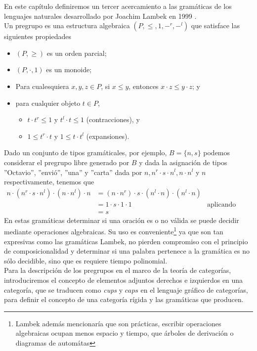 \documentclass[../main.tex]{subfiles}
\begin{document}
    En este capítulo definiremos un tercer acercamiento a las gramáticas de los lenguajes naturales desarrollado por Joachim Lambek en 1999 \cite{lambek99}. \\
    Un pregrupo es una estructura algebraica $(P,\leq,1, -^r,- ^l)$ que satisface las siguientes propiedades
        \begin{itemize}
            \item $(P, \geq)$ es un orden parcial;
            \item $(P,\cdot,1)$ es un monoide;
            \item Para cualesquiera $x,y,z \in P$, si $x \leq y$, entonces $x\cdot z \leq y \cdot z$; y
            \item para cualquier objeto $t \in P$,
            \begin{itemize}
                \item $t \cdot t^r \leq 1$ y $t^l \cdot t \leq 1$ (contracciones), y
                \item $1 \leq t^r \cdot t$ y $1 \leq t \cdot t^l$ (expansiones).
            \end{itemize}
        \end{itemize}
    Dado un conjunto de tipos gramáticales, por ejemplo, $B=\{ n,s \}$ podemos considerar el pregrupo libre generado por $B$ y dada la asignación de tipos ''Octavio'', ''envió'', ''una'' y ''carta'' dada por $n, n^r \cdot s \cdot n^l, n\cdot n^l$ y $n$ respectivamente, tenemos que
    \begin{align*}
        n \cdot (n^r \cdot s \cdot n^l) \cdot (n\cdot n^l) \cdot n &= (n \cdot n^r) \cdot s \cdot (n^l \cdot n)  \cdot (n^l \cdot n) \\
        &=1 \cdot s \cdot 1 \cdot 1 & \text{aplicando contracciones} \\
        &=s
    \end{align*}
    En estas gramáticas determinar si una oración es o no válida se puede decidir mediante operaciones algebraicas. Su uso es conveniente\footnote{Lambek además mencionaría que son prácticas, escribir operaciones algebraicas ocupan menos espacio y tiempo, que árboles de derivación o diagramas de automátas} ya que son tan expresivas como las gramáticas Lambek, no pierden compromiso con el principio de composicionalidad y determinar si una palabra pertenece a la gramática es no sólo decidible, sino que es requiere tiempo polinomial. \\
    Para la descripción de los pregrupos en el marco de la teoría de categorías, introduciremos el concepto de elementos adjuntos derechos e izquierdos en una categoría, que se traducen como \textit{cups} y $\textit{caps}$ en el lenguaje gráfico de categorías, para definir el concepto de una categoría rígida y las gramáticas que producen.  
\end{document}
